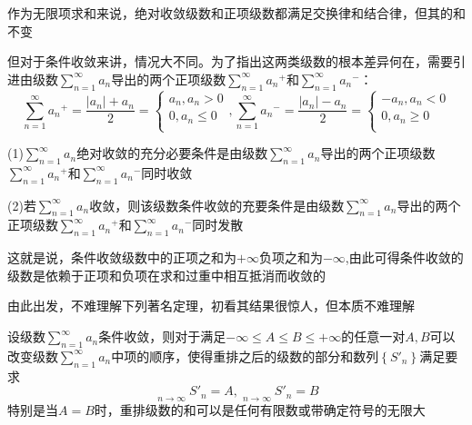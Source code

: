 \documentclass[lang=cn,10pt]{elegantbook}
\begin{document}
作为无限项求和来说，绝对收敛级数和正项级数都满足交换律和结合律，但其的和不变

但对于条件收敛来讲，情况大不同。为了指出这两类级数的根本差异何在，需要引进由级数$\sum_{n=1}^{\infty}{a_n}$导出的两个正项级数$\sum_{n=1}^{\infty}{{a_n}^+\text{和}\sum_{n=1}^{\infty}{{a_n}^-}}$：
\begin{equation*}
	\sum_{n=1}^{\infty}{{a_n}^+=\frac{|a_n|+a_n}{2}=\begin{cases}
			a_n,a_n>0\\
			0,a_n\le 0\\
		\end{cases},\sum_{n=1}^{\infty}{{a_n}^-=\frac{|a_n|-a_n}{2}=\begin{cases}
				-a_n,a_n<0\\
				0,a_n\ge 0\\
	\end{cases}}}
\end{equation*}
\begin{proposition}
	
	(1)$\sum_{n=1}^{\infty}{a_n}$绝对收敛的充分必要条件是由级数$\sum_{n=1}^{\infty}{a_n}$导出的两个正项级数$\sum_{n=1}^{\infty}{{a_n}^+\text{和}\sum_{n=1}^{\infty}{{a_n}^-}}$同时收敛
	
	(2)若$\sum_{n=1}^{\infty}{a_n}$收敛，则该级数条件收敛的充要条件是由级数$\sum_{n=1}^{\infty}{a_n}$导出的两个正项级数$\sum_{n=1}^{\infty}{{a_n}^+\text{和}\sum_{n=1}^{\infty}{{a_n}^-}}$同时发散
\end{proposition}
\begin{remark}
	
	这就是说，条件收敛级数中的正项之和为$+\infty$负项之和为$-\infty$,由此可得条件收敛的级数是依赖于正项和负项在求和过重中相互抵消而收敛的
\end{remark}

由此出发，不难理解下列著名定理，初看其结果很惊人，但本质不难理解
\begin{proposition}[Riemann重排定理]
	设级数$\sum_{n=1}^{\infty}{a_n}$条件收敛，则对于满足$-\infty\le A\le B\le +\infty$的任意一对$A,B$可以改变级数$\sum_{n=1}^{\infty}{a_n}$中项的顺序，使得重排之后的级数的部分和数列$\left\{ S\prime_n \right\} $满足要求
	\begin{equation*}
		\mathop {\underline{\lim }} \limits_{n\rightarrow \infty}S\prime_n=A,\mathop {\overline{\lim }} \limits_{n\rightarrow \infty}S\prime_n=B
	\end{equation*}
	特别是当$A=B$时，重排级数的和可以是任何有限数或带确定符号的无限大
\end{proposition}
\end{document}
